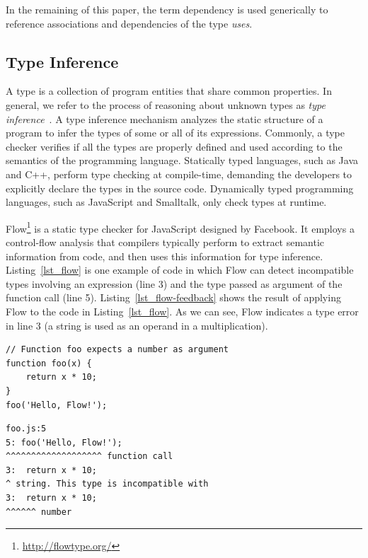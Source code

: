 \documentclass[review]{elsarticle}
\begin{document}
In the remaining of this paper, the term dependency is used generically to reference associations and dependencies of the type \textit{uses}.


\subsection{Type Inference}
\label{subsec:type-inference}

A type is a collection of program entities that share common properties. In general, we refer to the process of reasoning about unknown types as \textit{type inference}~\cite{Palsberg:1991}. A type inference mechanism analyzes the static structure of a program to infer the types of some or all of its expressions. Commonly, a type checker verifies if all the types are properly defined and used according to the semantics of the programming language. Statically typed languages, such as Java and C++, perform type checking at compile-time, demanding the developers to explicitly declare the types in the source code. Dynamically typed programming languages, such as JavaScript and Smalltalk, only check types at runtime. 

Flow\footnote{\url{http://flowtype.org/}} is a static type checker for JavaScript designed by Facebook. It employs a control-flow analysis that compilers typically perform to extract semantic information from code, and then uses this information for type inference. Listing~\ref{lst_flow} is one example of code in which Flow can detect incompatible types involving an expression (line 3) and the type passed as argument of the function call (line 5). Listing~\ref{lst_flow-feedback} shows the result of applying Flow to the code in Listing~\ref{lst_flow}. As we can see, Flow indicates a type error in line 3 (a string is used as an operand in a multiplication).


\begin{lstlisting}[caption=Example of incompatible types detected by Flow, label=lst_flow]
// Function foo expects a number as argument
function foo(x) {  
	return x * 10;
}
foo('Hello, Flow!');
\end{lstlisting} 

\begin{lstlisting}[caption=Warning messages from Flow for the code in Listing~\ref{lst_flow}, label=lst_flow-feedback]
foo.js:5
5: foo('Hello, Flow!');
^^^^^^^^^^^^^^^^^^^ function call
3: 	return x * 10;
^ string. This type is incompatible with
3: 	return x * 10;
^^^^^^ number
\end{lstlisting} 
\end{document}
